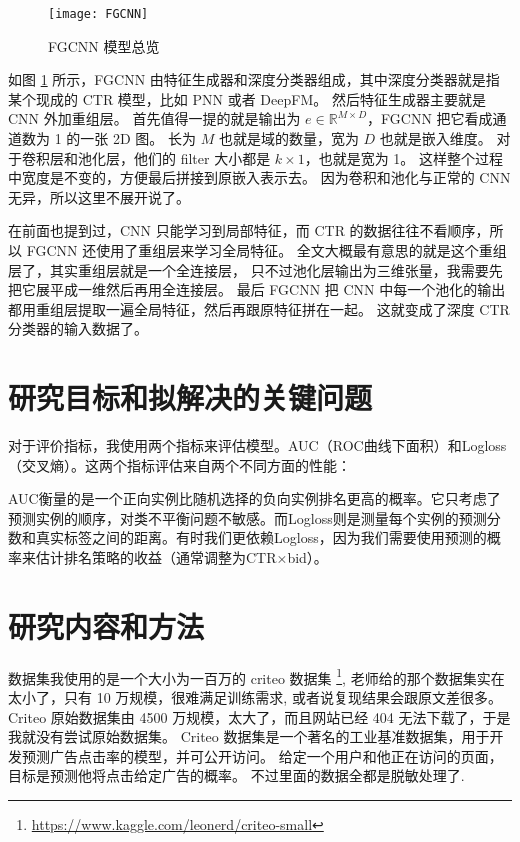 \documentclass[degree=master,cjk-font=noto]{thuthesis}
\begin{document}
\begin{figure}[h]
\centering%
\texttt{[image: FGCNN]}
  \caption{FGCNN 模型总览}
  \label{fig:fgcnn}
\end{figure}

如图 \ref{fig:fgcnn} 所示，FGCNN 由特征生成器和深度分类器组成，其中深度分类器就是指某个现成的 CTR 模型，比如 PNN 或者 DeepFM。
然后特征生成器主要就是 CNN 外加重组层。
首先值得一提的就是输出为 $e \in \mathbb{R}^{M \times D}$，FGCNN 把它看成通道数为 1 的一张 2D 图。
长为 $M$ 也就是域的数量，宽为 $D$ 也就是嵌入维度。
对于卷积层和池化层，他们的 filter 大小都是 $k \times 1$，也就是宽为 1。
这样整个过程中宽度是不变的，方便最后拼接到原嵌入表示去。
因为卷积和池化与正常的 CNN 无异，所以这里不展开说了。

在前面也提到过，CNN 只能学习到局部特征，而 CTR 的数据往往不看顺序，所以 FGCNN 还使用了重组层来学习全局特征。
全文大概最有意思的就是这个重组层了，其实重组层就是一个全连接层，
只不过池化层输出为三维张量，我需要先把它展平成一维然后再用全连接层。
最后 FGCNN 把 CNN 中每一个池化的输出都用重组层提取一遍全局特征，然后再跟原特征拼在一起。
这就变成了深度 CTR 分类器的输入数据了。

\chapter{研究目标和拟解决的关键问题}
\label{chap:metrics}

对于评价指标，我使用两个指标来评估模型。AUC（ROC曲线下面积）和Logloss（交叉熵）。这两个指标评估来自两个不同方面的性能：

AUC衡量的是一个正向实例比随机选择的负向实例排名更高的概率。它只考虑了预测实例的顺序，对类不平衡问题不敏感。而Logloss则是测量每个实例的预测分数和真实标签之间的距离。有时我们更依赖Logloss，因为我们需要使用预测的概率来估计排名策略的收益（通常调整为CTR×bid）。

\chapter{研究内容和方法}

数据集我使用的是一个大小为一百万的 criteo 数据集 \footnote{\url{https://www.kaggle.com/leonerd/criteo-small}}, 老师给的那个数据集实在太小了，只有 10 万规模，很难满足训练需求, 或者说复现结果会跟原文差很多。
Criteo 原始数据集由 4500 万规模，太大了，而且网站已经 404 无法下载了，于是我就没有尝试原始数据集。
Criteo 数据集是一个著名的工业基准数据集，用于开发预测广告点击率的模型，并可公开访问。 给定一个用户和他正在访问的页面，目标是预测他将点击给定广告的概率。
不过里面的数据全都是脱敏处理了.
\end{document}
